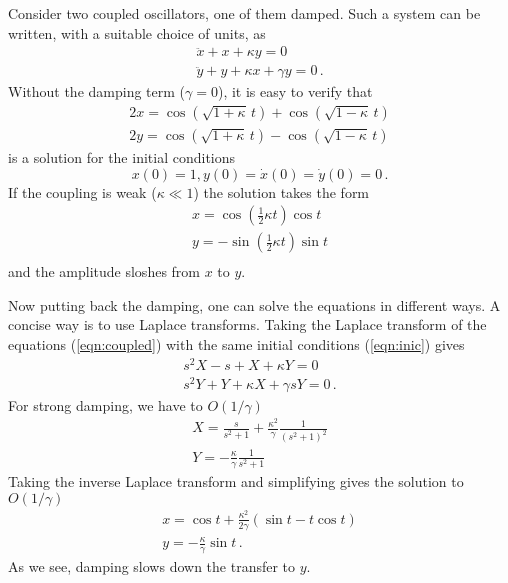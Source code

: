 \documentclass[12pt,aps,prb,preprint]{revtex4}
\begin{document}
Consider two coupled oscillators, one of them damped.  Such a system
can be written, with a suitable choice of units, as
\begin{equation}
\begin{array}{l}
\ddot x + x + \kappa y = 0 \\
\ddot y + y + \kappa x + \gamma y = 0 \,.
\label{eqn:coupled}
\end{array}
\end{equation}
Without the damping term ($\gamma=0$), it is easy to verify that
\begin{equation}
\begin{array}{l}
2x = \cos(\sqrt{1+\kappa}\,t) + \cos(\sqrt{1-\kappa}\,t)  \\
2y = \cos(\sqrt{1+\kappa}\,t) - \cos(\sqrt{1-\kappa}\,t)
\end{array}
\end{equation}
is a solution for the initial conditions
\begin{equation}
x(0) = 1, y(0) = \dot x(0) = \dot y(0) = 0 \,.
\label{eqn:inic}
\end{equation}
If the coupling is weak ($\kappa\ll1$) the solution takes the form
\begin{equation}
\begin{array}{l}
x = \cos\left(\frac12\kappa t\right) \cos t \\
y = -\sin\left(\frac12\kappa t\right) \sin t \\
\end{array}
\end{equation}
and the amplitude sloshes from $x$ to $y$.

Now putting back the damping, one can solve the equations in different
ways.  A concise way is to use Laplace transforms.  Taking the Laplace
transform of the equations (\ref{eqn:coupled}) with the same initial
conditions (\ref{eqn:inic}) gives
\begin{equation}
\begin{array}{l}
s^2 X - s + X + \kappa Y = 0 \\
s^2 Y + Y + \kappa X + \gamma s Y = 0 \,.
\end{array}
\end{equation}
For strong damping, we have to $O(1/\gamma)$
\begin{equation}
\begin{array}{l}
\displaystyle
X = \frac s{s^2+1} + \frac{\kappa^2}\gamma \frac1{(s^2+1)^2} \\
\displaystyle
Y = -\frac\kappa\gamma \frac1{s^2+1}
\end{array}
\end{equation}
Taking the inverse Laplace transform and simplifying gives the
solution to $O(1/\gamma)$
\begin{equation}
\begin{array}{l}
\displaystyle
x = \cos t + \frac{\kappa^2}{2\gamma} (\sin t - t\cos t) \\
\displaystyle
y = -\frac\kappa\gamma \sin t \,.
\end{array}
\end{equation}
As we see, damping slows down the transfer to $y$.
\end{document}
